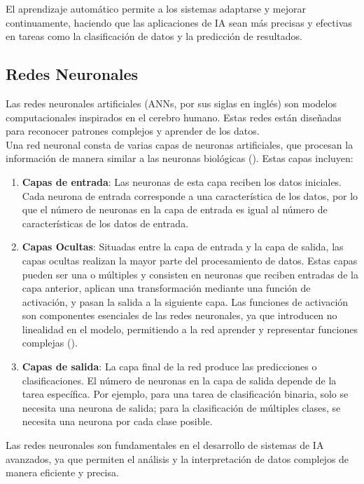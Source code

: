 El aprendizaje automático permite a los sistemas adaptarse y mejorar continuamente, haciendo que las aplicaciones de IA sean más precisas y efectivas en tareas como la clasificación de datos y la predicción de resultados.

\subsection{Redes Neuronales}
Las redes neuronales artificiales (ANNs, por sus siglas en inglés) son modelos computacionales inspirados en el cerebro humano. Estas redes están diseñadas para reconocer patrones complejos y aprender de los datos.\\   
Una red neuronal consta de varias capas de neuronas artificiales, que procesan la información de manera similar a las neuronas biológicas (\cite{goodfellow2016deep}). Estas capas incluyen:

\begin{enumerate}[topsep=0pt, itemsep=0mm]  
    \item \textbf{Capas de entrada}: Las neuronas de esta capa reciben los datos iniciales. Cada neurona de entrada corresponde a una característica de los datos, por lo que el número de neuronas en la capa de entrada es igual al número de características de los datos de entrada.
    \item \textbf{Capas Ocultas}: Situadas entre la capa de entrada y la capa de salida, las capas ocultas realizan la mayor parte del procesamiento de datos. Estas capas pueden ser una o múltiples y consisten en neuronas que reciben entradas de la capa anterior, aplican una transformación mediante una función de activación, y pasan la salida a la siguiente capa. Las funciones de activación son componentes esenciales de las redes neuronales, ya que introducen no linealidad en el modelo, permitiendo a la red aprender y representar funciones complejas (\cite{nielsen2015neural}).
    \item \textbf{Capas de salida}: La capa final de la red produce las predicciones o clasificaciones. El número de neuronas en la capa de salida depende de la tarea específica. Por ejemplo, para una tarea de clasificación binaria, solo se necesita una neurona de salida; para la clasificación de múltiples clases, se necesita una neurona por cada clase posible.
\end{enumerate} 

Las redes neuronales son fundamentales en el desarrollo de sistemas de IA avanzados, ya que permiten el análisis y la interpretación de datos complejos de manera eficiente y precisa.

